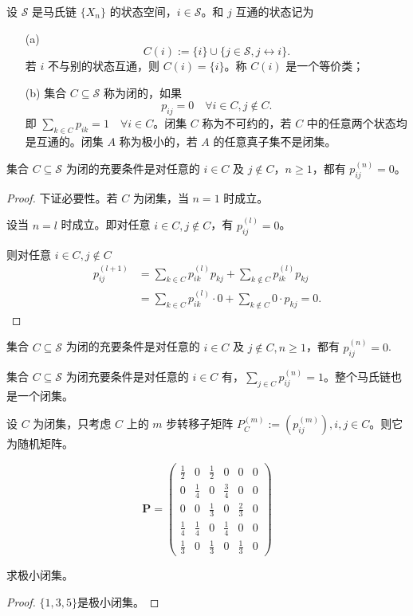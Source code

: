 \documentclass[lang=cn,10pt,thmcnt=section]{elegantbook}
\begin{document}
\begin{definition}[闭集]
	设 $\mathcal{S}$ 是马氏链 $\{X_n\}$ 的状态空间，$i \in \mathcal{S}$。和 $j$ 互通的状态记为
\begin{enumerate}
    \item[(a)]
    \[
    C(i) := \{i\} \cup \{j \in \mathcal{S}, j \leftrightarrow i\}.
    \]
    若 $i$ 不与别的状态互通，则 $C(i) = \{i\}$。称 $C(i)$ 是一个等价类；
    \item[(b)]  集合 $C \subseteq \mathcal{S}$ 称为闭的，如果
    \[
    p_{ij} = 0 \quad \forall i \in C, j \notin C.
    \]
    即 $\sum_{k \in C} p_{ik} = 1 \quad \forall i \in C$。闭集 $C$ 称为不可约的，若 $C$ 中的任意两个状态均是互通的。闭集 $A$ 称为极小的，若 $A$ 的任意真子集不是闭集。
\end{enumerate}
\end{definition}
\begin{theorem}
	集合 $C \subseteq \mathcal{S}$ 为闭的充要条件是对任意的 $i \in C$ 及 $j \notin C$，$n \geq 1$，都有 $p_{ij}^{(n)} = 0$。
\end{theorem}
\begin{proof}
	下证必要性。若 $C$ 为闭集，当 $n = 1$ 时成立。

设当 $n = l$ 时成立。即对任意 $i \in C, j \notin C$，有 $p_{ij}^{(l)} = 0$。

则对任意 $i \in C, j \notin C$
\begin{align*}
p_{ij}^{(l+1)} &= \sum_{k \in C} p_{ik}^{(l)} p_{kj} + \sum_{k \notin C} p_{ik}^{(l)} p_{kj} \\
&= \sum_{k \in C} p_{ik}^{(l)} \cdot 0 + \sum_{k \notin C} 0 \cdot p_{kj} = 0.
\end{align*}
\end{proof}
\begin{theorem}
	集合 $C \subseteq \mathcal{S}$ 为闭的充要条件是对任意的 $i \in C$ 及 $j \notin C, n \geq 1$，都有 $p_{ij}^{(n)} = 0$.
\end{theorem}
\begin{remark}
	集合 $C \subseteq \mathcal{S}$ 为闭充要条件是对任意的 $i \in C$ 有，$\sum_{j \in C} p_{ij}^{(n)} = 1$。整个马氏链也是一个闭集。
\end{remark}
\begin{lemma}
	设 $C$ 为闭集，只考虑 $C$ 上的 $m$ 步转移子矩阵 $P_C^{(m)} := (p_{ij}^{(m)}), i, j \in C$。则它为随机矩阵。
\end{lemma}
\begin{example}
	\[
\mathbf{P} = \begin{pmatrix}
\frac{1}{2} & 0 & \frac{1}{2} & 0 & 0 & 0 \\
0 & \frac{1}{4} & 0 & \frac{3}{4} & 0 & 0 \\
0 & 0 & \frac{1}{3} & 0 & \frac{2}{3} & 0 \\
\frac{1}{4} & \frac{1}{4} & 0 & \frac{1}{4} & 0 & 0 \\
\frac{1}{3} & 0 & \frac{1}{3} & 0 & \frac{1}{3} & 0
\end{pmatrix}
\]

求极小闭集。
\end{example}
\begin{proof}
	\(\{1, 3, 5\} \text{是极小闭集。}\)
\end{proof}
\end{document}
